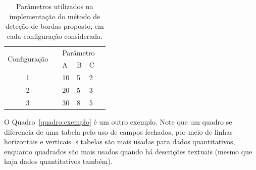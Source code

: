 \documentclass[a4paper, 12pt]{ppgeb}
\begin{document}
\begin{table}[h]
\centering
\caption{Parâmetros utilizados na implementação do método de deteção de bordas proposto, em cada configuração considerada.}\label{tab:exemplo}
\begin{tabular}{ccllll}
\cline{1-5}
\multirow{2}{*}{Configuração} && \multicolumn{3}{l}{\hspace*{12pt}Parâmetro}&  \\
&& \hspace{4pt}A\hspace{4pt} & \hspace{4pt}B\hspace{4pt} & \hspace{4pt}C\hspace{4pt} & \\ \cline{1-5}
1                             && \hspace{4pt}10\hspace{4pt}        & \hspace{4pt}5\hspace{4pt}       & \hspace{4pt}2\hspace{4pt}       &  \\
2                             && \hspace{4pt}20\hspace{4pt}        & \hspace{4pt}5\hspace{4pt}       & \hspace{4pt}3\hspace{4pt}       &  \\
3                             && \hspace{4pt}30\hspace{4pt}        & \hspace{4pt}8\hspace{4pt}       & \hspace{4pt}5\hspace{4pt}       &  \\ \cline{1-5}
\end{tabular}
\end{table}

O Quadro~\ref{quadro:exemplo} é um outro exemplo. 
Note que um quadro se diferencia de uma tabela pelo uso de campos fechados, 
por meio de linhas horizontais e verticais. 
s tabelas são mais usadas para dados quantitativos, 
enquanto quadrados são mais usados quando há descrições textuais 
(mesmo que haja dados quantitativos também).
\end{document}
